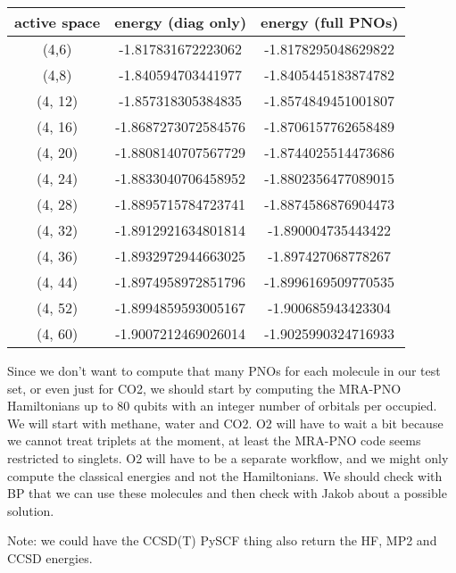 \documentclass{article}
\begin{document}
\begin{center}
\begin{tabular}{ |c| c|c| }
\hline
 active space &  energy (diag only) & energy (full PNOs) \\ 
 \hline 
 (4,6) & -1.817831672223062 & -1.8178295048629822 \\
 \hline
 (4,8) & -1.840594703441977 & -1.8405445183874782 \\
 \hline
 (4, 12) &  -1.857318305384835 & -1.8574849451001807 \\
 \hline
 (4, 16) &  -1.8687273072584576 & -1.8706157762658489 \\
 \hline
 (4, 20) & -1.8808140707567729 & -1.8744025514473686 \\
 \hline
 (4, 24) &  -1.8833040706458952 & -1.8802356477089015 \\
 \hline
 (4, 28) &  -1.8895715784723741 & -1.8874586876904473 \\
 \hline
 (4, 32) &  -1.8912921634801814 & -1.890004735443422 \\
 \hline
 (4, 36) & -1.8932972944663025 & -1.897427068778267 \\
 \hline
 (4, 44) & -1.8974958972851796 & -1.8996169509770535 \\
 \hline
 (4, 52) & -1.8994859593005167 & -1.900685943423304 \\
 \hline
 (4, 60) & -1.9007212469026014 & -1.9025990324716933 \\
 \hline
\end{tabular}
\end{center}


Since we don't want to compute that many PNOs for each molecule in our test set, or even just for CO2, we should start by computing the MRA-PNO Hamiltonians up to 80 qubits with an integer number of orbitals per occupied. We will start with methane, water and CO2. O2 will have to wait a bit because we cannot treat triplets at the moment, at least the MRA-PNO code seems restricted to singlets.
O2 will have to be a separate workflow, and we might only compute the classical energies and not the Hamiltonians. We should check with BP that we can use these molecules and then check with Jakob about a possible solution.

Note: we could have the CCSD(T) PySCF thing also return the HF, MP2 and CCSD energies.
\end{document}
